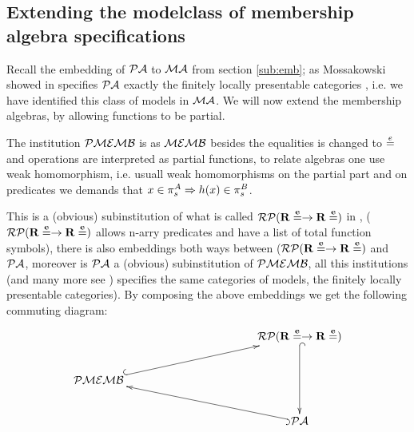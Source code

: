 \documentclass[10pt]{article}
\begin{document}
\subsection{Extending the modelclass of membership algebra specifications}
Recall the embedding of ${\mathcal{PA}}$ to ${\mathcal{MA}}$ from section \ref{sub:emb}; as Mossakowski showed in \cite{mossa} specifies ${\mathcal{PA}}$ exactly the finitely locally presentable categories \cite{locally}, i.e. we have identified this class of models in ${\mathcal{MA}}$. %
We will now extend the membership algebras, by allowing functions to be partial.  
\begin{definition}
The institution ${\mathcal{PMEMB}}$ is as ${\mathcal{MEMB}}$ besides the equalities is changed to $\stackrel{e}{=}$ and operations are interpreted as partial functions, to relate algebras one use weak homomorphism, i.e. usuall weak homomorphisms on the partial part and on predicates we demands that $x \in \pi_s^A \Rightarrow h(x) \in \pi_s^B$.
\end{definition}

This is a (obvious) subinstitution of what is called ${{\mathcal{RP}}(\bf{R\stackrel{e}{=}\to R\stackrel{e}{=}})}$ in \cite{mossa}, (${{\mathcal{RP}}(\bf{R\stackrel{e}{=}\to R\stackrel{e}{=}})}$ allows n-arry predicates and have a list of total function symbols), there is also embeddings both ways between (${{\mathcal{RP}}(\bf{R\stackrel{e}{=}\to R\stackrel{e}{=}})}$ and ${\mathcal{PA}}$, moreover is ${\mathcal{PA}}$ a (obvious) subinstitution of ${\mathcal{PMEMB}}$, all this institutions (and many more see \cite{mossa}) specifies the same categories of models, the finitely locally presentable categories). By composing the above embeddings we get the following commuting diagram:
\[
\xymatrix{	&&&& \inst{\inst{RP}(\bf{R\eeq \to R\eeq})} \ar@{^{(}->}[dd] \\%
	\inst{PMEMB} \ar@{^{(}->}[rrrru]\\ 
		&&&& \inst{PA} \ar@{^{(}->}[llllu]\\
}
\]
\end{document}
